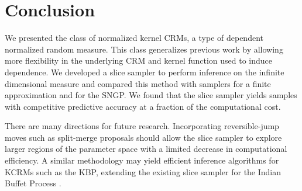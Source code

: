 \section{Conclusion}


We presented the class of normalized kernel CRMs, a type of dependent 
normalized random measure.  This class generalizes previous work
by allowing more flexibility in the underlying CRM and kernel function used to
induce dependence.
We developed a slice sampler to perform inference on the infinite
dimensional measure and compared this method with samplers for a finite 
approximation and for the SNGP.  We found that the slice sampler yields
samples with competitive predictive accuracy at a fraction of the computational
cost.

There are many directions for future research.  
Incorporating
reversible-jump moves \cite{Green:Hastie:2009} such as split-merge proposals
should allow the slice sampler to explore larger regions of the parameter space
with a limited decrease in computational efficiency. A similar methodology may yield efficient inference algorithms for KCRMs such as the KBP, extending the existing slice sampler for the Indian Buffet Process
\cite{TehGorGha2007}.
